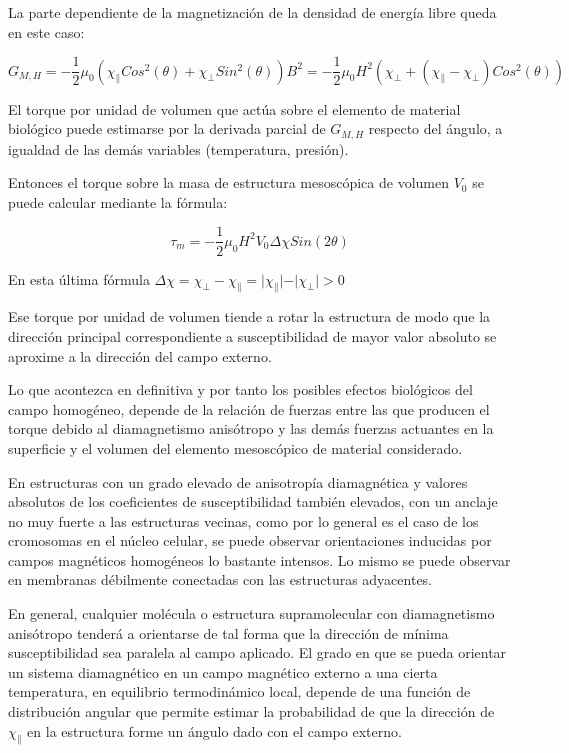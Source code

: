 La parte dependiente de la magnetización de la densidad de energía libre queda en este caso: 

\begin{equation}
	\label{eq:617}
G_{M, H}= -\dfrac{1}{2}\mu_{0}(\chi_{\parallel}Cos^{2}(\theta)+\chi_{\perp}Sin^{2}(\theta))B^{2}=-\dfrac{1}{2}\mu_{0}H^{2}(\chi_{\perp}+(\chi_{\parallel}-\chi_{\perp})Cos^{2}(\theta))
\end{equation}

El torque por unidad de volumen que actúa sobre el elemento de material biológico puede estimarse por la derivada parcial de $G_{M, H}$ respecto del ángulo, a igualdad de las demás variables (temperatura, presión).

Entonces el torque sobre la masa de estructura mesoscópica de volumen $V_{0}$ se puede calcular mediante la fórmula:

\begin{equation}
	\label{eq:618}
\tau_{m}=-\dfrac{1}{2}\mu_{0}H^{2}V_{0}\Delta\chi Sin(2\theta)
\end{equation}

En esta última fórmula $\Delta\chi=\chi_{\perp}-\chi_{\parallel}=\vert \chi_{\parallel} \vert - \vert \chi_{\perp} \vert > 0$

Ese torque por unidad de volumen tiende a rotar la estructura de modo que la dirección principal correspondiente a susceptibilidad de mayor valor absoluto se aproxime a la dirección del campo externo.

Lo que acontezca en definitiva y por tanto los posibles efectos biológicos del campo homogéneo, depende de la relación de fuerzas entre las que producen el torque debido al diamagnetismo anisótropo y las demás fuerzas actuantes en la superficie y el volumen del elemento mesoscópico de material considerado.

En estructuras con un grado elevado de anisotropía diamagnética y valores absolutos de los coeficientes de susceptibilidad también elevados, con un anclaje no muy fuerte a las estructuras vecinas, como por lo general es el caso de los cromosomas en el núcleo celular, se puede observar orientaciones inducidas por campos magnéticos homogéneos lo bastante intensos. Lo mismo se puede observar en membranas débilmente conectadas con las estructuras adyacentes.

En general, cualquier molécula o estructura supramolecular con diamagnetismo anisótropo tenderá a orientarse de tal forma que la dirección de mínima susceptibilidad sea paralela al campo aplicado. El grado en que se pueda orientar un sistema diamagnético en un campo magnético externo a una cierta temperatura, en equilibrio termodinámico local, depende de una función de distribución angular que permite estimar la probabilidad de que la dirección de $\chi_{\parallel}$ en la estructura forme un ángulo dado con el campo externo.

